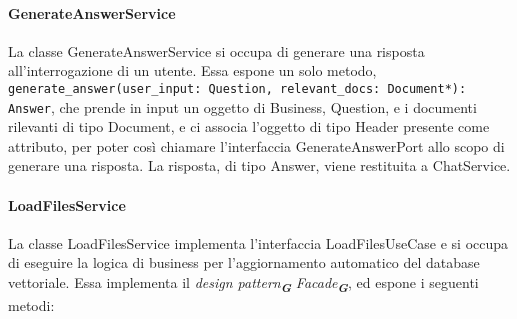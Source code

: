 \paragraph{GenerateAnswerService}
\label{sec:generate_answer_service}
La classe GenerateAnswerService si occupa di generare una risposta all'interrogazione di un utente. Essa espone un solo metodo, \texttt{generate\_answer(user\_input: Question, relevant\_docs: Document*): Answer}, che prende in input un oggetto di Business, Question, e i documenti rilevanti di tipo Document, e ci associa l'oggetto di tipo Header presente come attributo, per poter così chiamare l'interfaccia GenerateAnswerPort allo scopo di generare una risposta. La risposta, di tipo Answer, viene restituita a ChatService.

\paragraph{LoadFilesService}
\label{sec:load_files_service}
La classe LoadFilesService implementa l'interfaccia LoadFilesUseCase e si occupa di eseguire la logica di business per l'aggiornamento automatico del database vettoriale. Essa implementa il \emph{design pattern}\textsubscript{\textbf{\textit{G}}} \emph{Facade}\textsubscript{\textbf{\textit{G}}}, ed espone i seguenti metodi:
